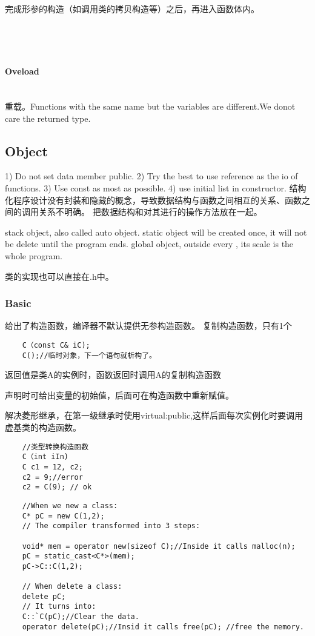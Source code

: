 \documentclass[UTF8]{../computerUniverse}
\begin{document}
完成形参的构造（如调用类的拷贝构造等）之后，再进入函数体内。
\begin{lstlisting}


    
\end{lstlisting}
\paragraph{Oveload} \quad\\
重载。Functions with the same name but the variables are different.We donot care the returned type.




\subsection{Object}

1) Do not set data member public.
2) Try the best to use reference as the io of functions.
3) Use const as most as possible.
4) use initial list in constructor.
结构化程序设计没有封装和隐藏的概念，导致数据结构与函数之间相互的关系、函数之间的调用关系不明确。
把数据结构和对其进行的操作方法放在一起。

stack object, also called auto object. 
static object will be created once, it will not be delete until the program ends.
global object, outside every {}, its scale is the whole program.

类的实现也可以直接在.h中。
\subsubsection{Basic}
给出了构造函数，编译器不默认提供无参构造函数。
复制构造函数，只有1个
\begin{lstlisting}
    C（const C& iC);
    C();//临时对象，下一个语句就析构了。
\end{lstlisting}
返回值是类A的实例时，函数返回时调用A的复制构造函数

声明时可给出变量的初始值，后面可在构造函数中重新赋值。


解决菱形继承，在第一级继承时使用virtual:public,这样后面每次实例化时要调用虚基类的构造函数。
\begin{lstlisting}
    //类型转换构造函数
    C（int iIn)
    C c1 = 12, c2;
    c2 = 9;//error
    c2 = C(9); // ok
\end{lstlisting}



\begin{lstlisting}
    //When we new a class: 
    C* pC = new C(1,2);
    // The compiler transformed into 3 steps:

    void* mem = operator new(sizeof C);//Inside it calls malloc(n);
    pC = static_cast<C*>(mem);
    pC->C::C(1,2);

    // When delete a class:
    delete pC;
    // It turns into:
    C::`C(pC);//Clear the data.
    operator delete(pC);//Insid it calls free(pC); //free the memory.
\end{lstlisting}
\end{document}
